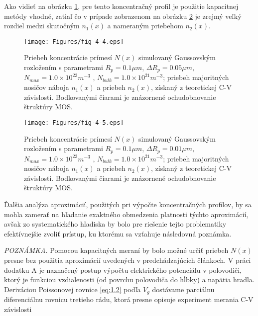 \par Ako vidieť na obrázku \ref{fig:4.4}, pre tento koncentračný
profil je použitie kapacitnej metódy vhodné, zatiaľ čo v prípade
zobrazenom na obrázku \ref{fig:4.5} je zrejmý veľký rozdiel medzi
skutočným $n_{1}(x)$ a nameraným priebehom $n_{2}(x)$.

\begin{figure}[h!]\centering
\texttt{[image: Figures/fig-4-4.eps]}
\captionsetup{justification=raggedright, singlelinecheck=false}
\caption[Priebeh koncentrácie prímesí simulovaný Gaussovským
  rozložením]{Priebeh koncentrácie prímesí $N(x)$ simulovaný
  Gaussovským rozložením s parametrami $R_{p} = 0.1\mu m$, $\Delta
  R_{p} = 0.05 \mu m$, $N_{max} = 1.0\times 10^{23} m^{-3}$ ,
  $N_{bulk} = 1.0\times 10^{21} m^{-3}$; priebeh majoritných nosičov
  náboja $n_{1}(x)$ a priebeh $n_{2}(x)$, získaný z teoretickej C-V
  závislosti. Bodkovanými čiarami je znázornené ochudobnovanie
  štruktúry MOS.}
\label{fig:4.4}
\end{figure}

\begin{figure}[h!]\centering
\texttt{[image: Figures/fig-4-5.eps]}
\captionsetup{justification=raggedright, singlelinecheck=false}
\caption[Priebeh koncentrácie prímesí simulovaný Gaussovským
  rozložením]{Priebeh koncentrácie prímesí $N(x)$ simulovaný
  Gaussovským rozložením s parametrami $R_{p} = 0.1\mu m$, $\Delta
  R_{p} = 0.01 \mu m$, $N_{max} = 1.0\times 10^{23} m^{-3}$ ,
  $N_{bulk} = 1.0\times 10^{21} m^{-3}$; priebeh majoritných nosičov
  náboja $n_{1}(x)$ a priebeh $n_{2}(x)$, získaný z teoretickej C-V
  závislosti. Bodkovanými čiarami je znázornené ochudobnovanie
  štruktúry MOS.}
\label{fig:4.5}
\end{figure}

\par Ďalšia analýza aproximácií, použitých pri výpočte koncentračných
profilov, by sa mohla zamerať na hľadanie exaktného obmedzenia
platnosti týchto aproximácií, avšak zo systematického hľadiska by bolo
pre riešenie tejto problematiky efektívnejšie zvoliť prístup, ku
ktorému sa vzťahuje následovná poznámka.

\par\emph{POZNÁMKA.} Pomocou kapacitných meraní by bolo možné určiť
priebeh $N(x)$ presne bez použitia aproximácií uvedených v
predchádzajúcich článkoch.  V práci \cite{4.4} dodatku A je naznačený
postup výpočtu elektrického potenciálu v polovodiči, ktorý je funkciou
vzdialenosti (od povrchu polovodiča do hĺbky) a napätia hradla.
Deriváciou Poissonovej rovnice \ref{eq:1.2} podľa $V_{g}$ dostávame
parciálnu diferenciálnu rovnicu tretieho rádu, ktorá presne opisuje
experiment merania C-V závislosti

